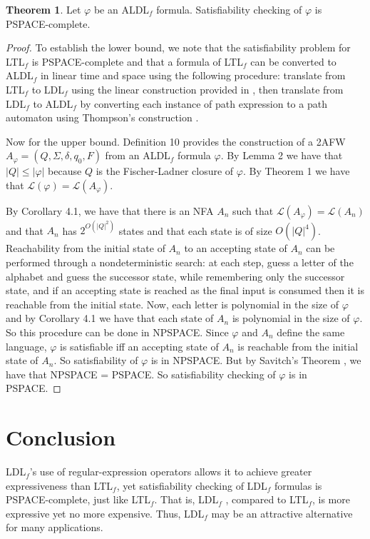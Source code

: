 \documentclass{lmcs}
\theoremstyle{definition}
\newtheorem{theorem}[thm]{Theorem}
\DeclareMathOperator{\?}{?}
\begin{document}
\begin{theorem}
Let $\varphi$ be an ALDL$_f$ formula. Satisfiability checking of $\varphi$ is PSPACE-complete.
\end{theorem}

\begin{proof}
To establish the lower bound, we note that the satisfiability problem for LTL$_f$ is PSPACE-complete and that a formula of LTL$_f$ can be converted to ALDL$_f$ in linear time and space using the following procedure: translate from LTL$_f$ to LDL$_f$ using the linear construction provided in \cite{ldlf}, then translate from LDL$_f$ to ALDL$_f$ by converting each instance of path expression to a path automaton using Thompson's construction \cite{thompson}.

Now for the upper bound. Definition 10 provides the construction of a 2AFW $A_{\varphi} = (Q, \Sigma, \delta, q_0, F)$ from an ALDL$_f$ formula $\varphi$. By Lemma 2 we have that $|Q| \leq |\varphi|$ because $Q$ is the Fischer-Ladner closure of $\varphi$. By Theorem 1 we have that $\mathcal{L}(\varphi) = \mathcal{L}(A_\varphi)$.

By Corollary 4.1, we have that there is an NFA $A_n$ such that $\mathcal{L}(A_{\varphi}) = \mathcal{L}(A_n)$ and that $A_n$ has $2^{O(|Q|^2)}$ states and that each state is of size $O(|Q|^4)$. Reachability from the initial state of $A_n$ to an accepting state of $A_n$ can be performed through a nondeterministic search: at each step, guess a letter of the alphabet and guess the successor state, while remembering only the successor state, and if an accepting state is reached as the final input is consumed then it is reachable from the initial state. Now, each letter is polynomial in the size of $\varphi$ and by Corollary 4.1 we have that each state of $A_n$ is polynomial in the size of $\varphi$. So this procedure can be done in NPSPACE. Since $\varphi$ and $A_n$ define the same language, $\varphi$ is satisfiable iff an accepting state of $A_n$ is reachable from the initial state of $A_n$. So satisfiability of $\varphi$ is in NPSPACE. But by Savitch's Theorem \cite{savitch}, we have that NPSPACE = PSPACE. So satisfiability checking of $\varphi$ is in PSPACE.
\end{proof}

\section{Conclusion}

LDL$_f$'s use of regular-expression operators allows it to achieve greater expressiveness than LTL$_f$, yet satisfiability checking of LDL$_f$ formulas is PSPACE-complete, just like LTL$_f$. That is,  LDL$_f$ , compared to LTL$_f$, is more expressive yet no more expensive. Thus, LDL$_f$ may be an attractive alternative for many applications.
\end{document}
